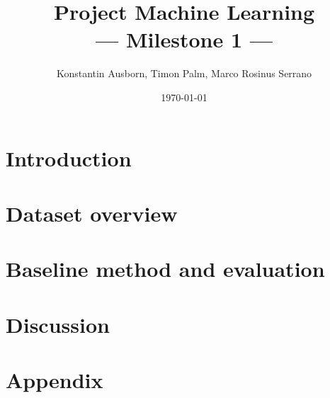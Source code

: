 \documentclass[10pt,a4paper,twoside]{article}
\title{Project Machine Learning\\--- Milestone 1 ---}
\author{Konstantin Ausborn, Timon Palm, Marco Rosinus Serrano}
\date{\today}
\begin{document}
    \maketitle
    \section{Introduction}\label{sec:introduction}
    
    \section{Dataset overview}\label{sec:dataset-overview}
    
    \section{Baseline method and evaluation}\label{sec:baseline-method-and-evaluation}
    
    \section{Discussion}\label{sec:discussion}
    
    
    \section{Appendix}\label{sec:appendix}
    
\end{document}

